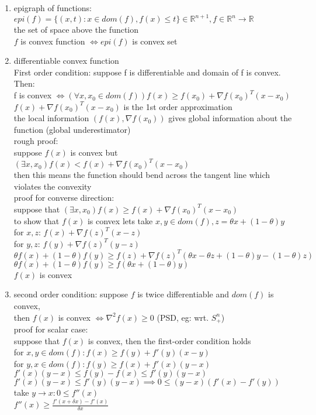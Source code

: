 \documentclass[12pt,letter]{article}
\newcommand{\R}{\mathbb{R}}
\newcommand{\set}[1]{\{#1\}}
\begin{document}
\begin{enumerate}
\item epigraph of functions: $epi(f)=\set{(x,t): x \in dom(f), f(x) \leq t} \in \R^{n+1}, f \in \R^n \to \R$\\
  the set of space above the function\\
  $f$ is convex function $\iff epi(f)$ is convex set\\
\item differentiable convex function\\
  First order condition:  suppose f is differentiable and domain of f is convex. Then:\\
  f is convex $\iff (\forall x,x_0 \in dom(f)) f(x) \geq f(x_0) + \nabla f(x_0)^T(x-x_0)$\\
  $f(x) + \nabla f(x_0)^T(x-x_0)$ is the 1st order approximation\\
  the local information $(f(x),\nabla f(x_0))$ gives global information about the function (global underestimator)\\

  rough proof:\\
  suppose $f(x)$ is convex but $(\exists x, x_0) f(x) < f(x) + \nabla f(x_0)^T(x-x_0)$\\
  then this means the function should bend across the tangent line which violates the convexity\\
  
  proof for converse direction:\\
  suppose that $(\exists x, x_0) f(x) \geq f(x) + \nabla f(x_0)^T(x-x_0)$\\
  to show that $f(x)$ is convex lets take $x,y \in dom(f), z= \theta x + (1-\theta)y$\\
  for $x,z$: $f(x) + \nabla f(z)^T(x-z)$\\
  for $y,z$: $f(y) + \nabla f(z)^T(y-z)$\\
  $\theta f(x) + (1-\theta) f(y) \geq f(z) + \nabla f(z)^T(\theta x - \theta z + (1-\theta)y - (1-\theta)z)$\\
  $\theta f(x) + (1-\theta) f(y) \geq f(\theta x +(1-\theta)y)$\\
  $f(x)$ is convex
\item second order condition: suppose $f$ is twice differentiable and $dom(f)$ is convex, \\
  then $f(x)$ is convex $\iff \nabla^2 f(x) \geq 0 $ (PSD, eg: wrt. $S_+^n$)\\
  
  proof for scalar case:\\
  suppose that $f(x)$ is convex, then the first-order condition holds\\
  for $x,y \in dom(f): f(x) \geq f(y) + f'(y)(x-y)$\\
  for $y,x \in dom(f): f(y) \geq f(x) + f'(x)(y-x)$\\
  $f'(x)(y-x) \leq f(y)-f(x) \leq f'(y)(y-x)$\\
  $f'(x)(y-x) \leq f'(y)(y-x) \implies 0 \leq (y-x)(f'(x)-f'(y))$\\
  take $y\to x: 0 \leq f''(x)$\\
  $f''(x) \geq \frac{f'(x+\delta x)-f'(x)}{\delta x}$\\


\end{enumerate}
\end{document}
